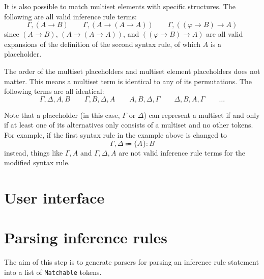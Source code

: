 It is also possible to match multiset elements with specific structures. The following are all valid inference rule terms:
\[
    \Gamma, (A \to B) \qquad \Gamma, (A \to (A \to A)) \qquad \Gamma, ((\varphi \to B) \to A)
\]
since $(A \to B)$, $(A \to (A \to A))$, and $((\varphi \to B) \to A)$ are all valid expansions of the definition of the second syntax rule, of which $A$ is a placeholder.

The order of the multiset placeholders and multiset element placeholders does not matter. This means a multiset term is identical to any of its permutations. The following terms are all identical:
\[
    \Gamma, \Delta, A, B \qquad \Gamma, B, \Delta, A \qquad A, B, \Delta, \Gamma \qquad \Delta, B, A, \Gamma \qquad \ldots
\]

Note that a placeholder (in this case, $\Gamma$ or $\Delta$) can represent a multiset if and only if at least one of its alternatives only consists of a multiset and no other tokens. For example, if the first syntax rule in the example above is changed to
\[
    \Gamma, \Delta \Coloneqq \{ A \}: B
\]
instead, things like $\Gamma, A$ and $\Gamma, \Delta, A$ are not valid inference rule terms for the modified syntax rule. 
\section{User interface}

\section{Parsing inference rules}
The aim of this step is to generate parsers for parsing an inference rule statement into a list of \lstinline{Matchable} tokens.

